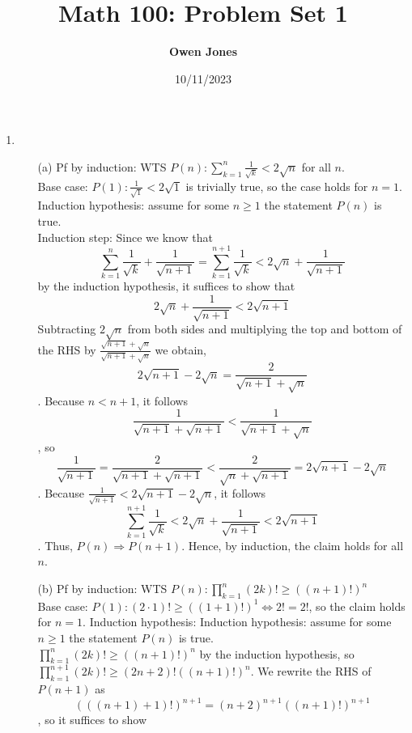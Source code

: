 \documentclass[10pt]{article}
\title{\bf Math 100: Problem Set 1}
\date{10/11/2023}
\author{\bf Owen Jones}
\begin{document}
\maketitle
\begin{enumerate}[label= (Q-\arabic*)]
    \item \begin{itemize}
        \item [(a)] Pf by induction: WTS $P(n):\displaystyle\sum_{k=1}^{n}\frac{1}{\sqrt{k}}<2\sqrt{n}$ for all $n$.\\
    Base case: $P(1):\frac{1}{\sqrt{1}}<2\sqrt{1}$ is trivially true, so the case holds for $n=1$.\\
    Induction hypothesis: assume for some $n\ge1$ the statement $P(n)$ is true.\\
    Induction step: Since we know that 
    $$
    \displaystyle\sum_{k=1}^{n}\frac{1}{\sqrt{k}}+\frac{1}{\sqrt{n+1}}=\sum_{k=1}^{n+1}\frac{1}{\sqrt{k}}<2\sqrt{n}+\frac{1}{\sqrt{n+1}}
    $$
     by the induction hypothesis, it suffices to show that 
     $$
     2\sqrt{n}+\frac{1}{\sqrt{n+1}}<2\sqrt{n+1}
     $$
    Subtracting $2\sqrt{n}$ from both sides and multiplying the top and bottom of the RHS by $\frac{\sqrt{n+1}+\sqrt{n}}{\sqrt{n+1}+\sqrt{n}}$ we obtain, 
    $$
    2\sqrt{n+1}-2\sqrt{n}=\frac{2}{\sqrt{n+1}+\sqrt{n}}
    $$. 
    Because $n<n+1$, it follows 
    $$
    \frac{1}{\sqrt{n+1}+\sqrt{n+1}}<\frac{1}{\sqrt{n+1}+\sqrt{n}}
    $$
    , so 
    $$
    \frac{1}{\sqrt{n+1}}=\frac{2}{\sqrt{n+1}+\sqrt{n+1}}<\frac{2}{\sqrt{n}+\sqrt{n+1}}=2\sqrt{n+1}-2\sqrt{n}
    $$. 
    Because $\frac{1}{\sqrt{n+1}}<2\sqrt{n+1}-2\sqrt{n}$, it follows 
    $$
    \sum_{k=1}^{n+1}\frac{1}{\sqrt{k}}<2\sqrt{n}+\frac{1}{\sqrt{n+1}}<2\sqrt{n+1}
    $$.
    Thus, $P(n)\Rightarrow P(n+1)$.
    Hence, by induction, the claim holds for all $n$.
        \item [(b)] Pf by induction: WTS $P(n):\displaystyle\prod_{k=1}^{n}(2k)!\ge{((n+1)!)}^n$\\
        Base case: $P(1):(2\cdot1)!\ge{((1+1)!)}^1\Leftrightarrow 2!=2!$, so the claim holds for $n=1$.
        Induction hypothesis: Induction hypothesis: assume for some $n\ge1$ the statement $P(n)$ is true.\\
        $\displaystyle\prod_{k=1}^{n}(2k)!\ge{((n+1)!)}^n$ by the induction hypothesis, so $\displaystyle\prod_{k=1}^{n+1}(2k)!\ge(2n+2)!{((n+1)!)}^n$.
        We rewrite the RHS of $P(n+1)$ as 
        $$
        {(((n+1)+1)!)}^{n+1}={(n+2)}^{n+1}{((n+1)!)}^{n+1}
        $$,
        so it suffices to show 

\end{itemize}
\end{enumerate}
\end{document}
